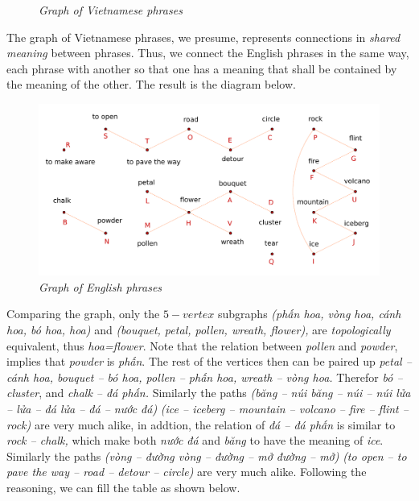 \begin{multicols}{2}
\begin{figure}[H]
	\caption{\small\textit{\color{toancuabi}Graph of Vietnamese phrases}}
	\vspace*{-10pt}
\end{figure}
The graph of Vietnamese phrases, we presume, represents connections in \textit{shared meaning} between phrases.
Thus, we connect the English phrases in the same way,
each phrase with another so that one has a meaning that shall be contained by the meaning of the other.
The result is the diagram below.
\begin{figure}[H]
	\vspace*{-5pt}
	\centering
	\captionsetup{labelformat= empty, justification=centering}
	\includegraphics[width= 1\linewidth]{hc-2022-2-2-2-2.pdf}
	\caption{\small\textit{\color{toancuabi}Graph of English phrases}}
	\vspace*{-10pt}
\end{figure}
Comparing the graph, only the $5-vertex$ subgraphs \textit{(phấn hoa, vòng hoa, cánh hoa, bó hoa, hoa)} and
\textit{(bouquet, petal, pollen, wreath, flower),} are \textit{topologically} equivalent, thus \textit{hoa=flower}.
Note that the relation between \textit{pollen} and \textit{powder},
implies that \textit{powder} is \textit{phấn}. The rest of the vertices then can be paired up
\textit{petal -- cánh hoa, bouquet -- bó hoa, pollen -- phấn hoa, wreath -- vòng hoa.}
Therefor \textit{bó -- cluster}, and \textit{chalk -- đá phấn.}
Similarly the paths \textit{(băng -- núi băng -- núi -- núi lửa -- lửa -- đá lửa -- đá -- nước đá)} 
\textit{(ice -- iceberg -- mountain -- volcano -- fire -- flint -- rock)} are very much alike,
in addtion, the relation of \textit{đá -- đá phấn} is similar to \textit{rock -- chalk,}
which make both \textit{nước đá} and \textit{băng} to have the meaning of \textit{ice}.
Similarly the paths \textit{(vòng -- đường vòng -- đường -- mở đường -- mở)} 
\textit{(to open -- to pave the way -- road -- detour -- circle)} are very much alike.
\vskip 0.1cm
Following the reasoning, we can fill the table as shown below.
\end{multicols}
